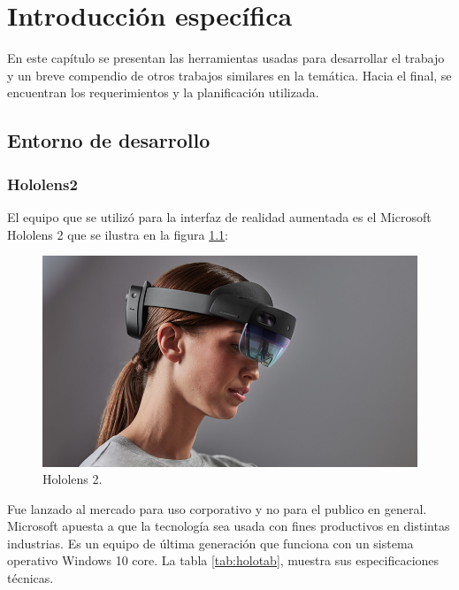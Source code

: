 \chapter{Introducción específica} %

\label{Chapter2}

En este capítulo se presentan las herramientas usadas para desarrollar el trabajo y un breve compendio de otros trabajos similares en la temática. Hacia el final, se encuentran los requerimientos y la planificación utilizada.

\section{Entorno de desarrollo}
\subsection{Hololens2}

El equipo que se utilizó para la interfaz de realidad aumentada es el Microsoft Hololens 2 \citep{HL} que se ilustra en la figura \ref{fig:hololens2}:

\begin{figure}[htpb]
	\centering
	\includegraphics[scale=.5]{./Figures/hololens2.jpeg}
	\caption{Hololens 2\protect\footnotemark.}
	\label{fig:hololens2}
\end{figure}


Fue lanzado al mercado para uso corporativo y no para el publico en general. Microsoft apuesta a que la tecnología sea usada con fines productivos en distintas industrias. Es un equipo de última generación que funciona con un sistema operativo Windows 10 core.  La tabla \ref{tab:holotab}, muestra sus especificaciones técnicas.

